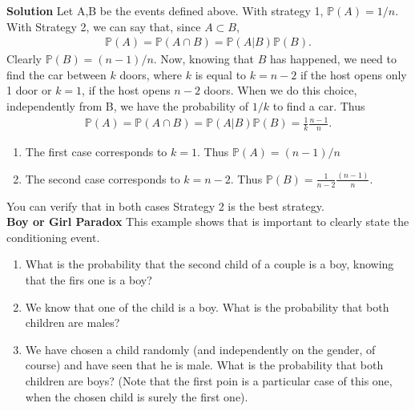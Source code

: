 \documentclass[12pt]{article}
\newcommand{\<}{{\langle \!\! \langle}}
\renewcommand{\>}{{\rangle \!\! \rangle}}
\newcommand{\bel}[2]{\begin{equation} \label{#1} \begin{split} #2
 					\end{split} \end{equation}}
\begin{document}
\textbf{Solution} Let A,B be the events defined above. 
With strategy 1, $\mathbb{P}(A)=1/n$. With Strategy 2, we can say that, since $A\subset B$,  
\bel{}{\mathbb{P}(A)=\mathbb{P}(A\cap B)=\mathbb{P}(A|B)\mathbb{P}(B).}
Clearly $\mathbb{P}(B)=(n-1)/n$. Now, knowing that $B$ has happened, we need to find the car between $k$ doors, where $k$ is equal to $k=n-2$ if the host opens only 1 door or $k=1$, if the host opens $n-2$ doors. When we do this choice, independently from B, we have the probability of $1/k$ to find a car. Thus 
\bel{}{\mathbb{P}(A)=\mathbb{P}(A\cap B)=\mathbb{P}(A|B)\mathbb{P}(B)=\frac{1}{k}\frac{n-1}{n}.}
\begin{enumerate}
    \item The first case corresponds to $k=1$. Thus $\mathbb{P}(A)=(n-1)/n$\\
    \item The second case corresponds to $k=n-2$. Thus  $\mathbb{P}(B)=\frac{1}{n-2}\frac{(n-1)}{n}$.
\end{enumerate}
You can verify that in both cases Strategy 2 is the best strategy. \\


\textbf{Boy or Girl Paradox}  This example shows that is important to clearly state the conditioning event. 

\begin{enumerate}

	\item What is the probability that the second child of a couple is a boy, knowing that the firs one is a boy?
	\item We know that one of the child is a boy. What is the probability that both children are males? 
	\item We have chosen a child randomly (and independently on the gender, of course) and have seen that he is male. What is the probability that both children are boys? (Note that the first poin is a particular case of this one, when the chosen child is surely the first one). 

\end{enumerate}
\end{document}
